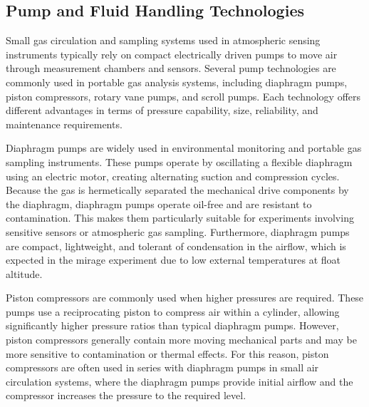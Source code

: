 \documentclass[
  a4paper,
  11pt,
  openany,
  parskip,
  toc=totoc,
  listof=totoc,
  bibliography=totoc
]{scrreprt}
\begin{document}

\subsection{Pump and Fluid Handling Technologies}

Small gas circulation and sampling systems used in atmospheric sensing instruments typically rely on compact electrically driven pumps to move air through measurement chambers and sensors. Several pump technologies are commonly used in portable gas analysis systems, including diaphragm pumps, piston compressors, rotary vane pumps, and scroll pumps. Each technology offers different advantages in terms of pressure capability, size, reliability, and maintenance requirements.

Diaphragm pumps are widely used in environmental monitoring and portable gas sampling instruments. These pumps operate by oscillating a flexible diaphragm using an electric motor, creating alternating suction and compression cycles. Because the gas is hermetically separated the mechanical drive components by the diaphragm, diaphragm pumps operate oil-free and are resistant to contamination. This makes them particularly suitable for experiments involving sensitive sensors or atmospheric gas sampling. Furthermore, diaphragm pumps are compact, lightweight, and tolerant of condensation in the airflow, which is expected in the \gls{mirage} experiment due to low external temperatures at float altitude.

Piston compressors are commonly used when higher pressures are required. These pumps use a reciprocating piston to compress air within a cylinder, allowing significantly higher pressure ratios than typical diaphragm pumps. However, piston compressors generally contain more moving mechanical parts and may be more sensitive to contamination or thermal effects. For this reason, piston compressors are often used in series with diaphragm pumps in small air circulation systems, where the diaphragm pumps provide initial airflow and the compressor increases the pressure to the required level.
\end{document}
